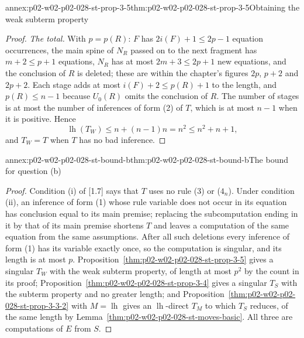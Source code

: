\begin{annexitem}{annex:p02-w02-p02-028-st-prop-3-5}{thm:p02-w02-p02-028-st-prop-3-5}{Obtaining the weak subterm property}
\begin{proof}
\emph{The total.}  With \(p=p(R)\): \(F\) has \(2i(F)+1\leq2p-1\) equation
occurrences, the main spine of \(N_R\) passed on to the next fragment has
\(m+2\leq p+1\) equations, \(N_R\) has at most \(2m+3\leq2p+1\) new equations,
and the conclusion of \(R\) is deleted; these are within the chapter's figures
\(2p\), \(p+2\) and \(2p+2\).  Each stage adds at most \(i(F)+2\leq p(R)+1\)
to the length, and \(p(R)\leq n-1\) because \(U_0(R)\) omits the conclusion
of \(R\).  The number of stages is at most the number of inferences of form
(2) of \(T\), which is at most \(n-1\) when it is positive.  Hence
\[
 \operatorname{lh}(T_W)\leq n+(n-1)n=n^2\leq n^2+n+1,
\]
and \(T_W=T\) when \(T\) has no bad inference.
\end{proof}
\end{annexitem}

\begin{annexitem}{annex:p02-w02-p02-028-st-bound-b}{thm:p02-w02-p02-028-st-bound-b}{The bound for question (b)}
\begin{proof}
Condition (i) of [1.7] says that \(T\) uses no rule (3) or (\(4_n\)).  Under
condition (ii), an inference of form (1) whose rule variable does not occur
in its equation has conclusion equal to its main premise; replacing the
subcomputation ending in it by that of its main premise shortens \(T\) and
leaves a computation of the same equation from the same assumptions.  After
all such deletions every inference of form (1) has its variable exactly
once, so the computation is singular, and its length is at most \(p\).
Proposition~\ref{thm:p02-w02-p02-028-st-prop-3-5} gives a singular \(T_W\)
with the weak subterm property, of length at most \(p^2\) by the count in
its proof; Proposition~\ref{thm:p02-w02-p02-028-st-prop-3-4} gives a
singular \(T_S\) with the subterm property and no greater length; and
Proposition~\ref{thm:p02-w02-p02-028-st-prop-3-3-2} with
\(M=\operatorname{lh}\) gives an \(\operatorname{lh}\)-direct \(T_M\) to which
\(T_S\) reduces, of the same length by
Lemma~\ref{thm:p02-w02-p02-028-st-moves-basic}.  All three are computations
of \(E\) from \(S\).
\end{proof}
\end{annexitem}

